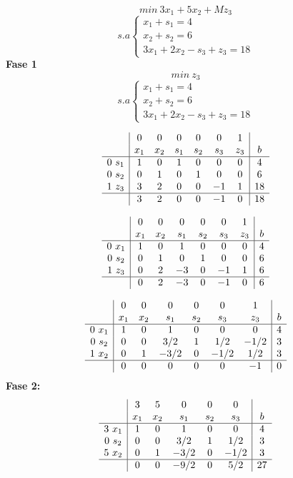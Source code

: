 \begin{ejemplo}
  
  $$ min ~ 3x_1+5x_2+M z_3 $$
  $$ s.a
  \left\{
    \begin{array}{c}
      x_1+s_1=4 \\
      x_2 + s_2 = 6 \\
      3x_1+2x_2-s_3+z_3=18
    \end{array}
  \right.
  $$
  \textbf{Fase 1}
  $$ min ~ z_3 $$
  $$ s.a \left\{
    \begin{array}{c}
      x_1+s_1=4 \\
      x_2 + s_2 = 6 \\
      3x_1+2x_2-s_3+z_3=18
    \end{array}
  \right.
  $$

  $$
  \begin{array}{c|cccccc|c}
    & 0 & 0 & 0 & 0 & 0 & 1 & \\
    & x_1 & x_2 & s_1 & s_2 & s_3 & z_3 & b \\ \hline
    0 ~ s_1 & 1 & 0 & 1 & 0 & 0 & 0 & 4 \\
    0 ~ s_2 & 0 & 1 & 0 & 1 & 0 & 0 & 6 \\
    1 ~ z_3 & 3 & 2 & 0 & 0 & -1 & 1 & 18 \\ \hline
    & 3 & 2 & 0 & 0 & -1 & 0 & 18
  \end{array}
  $$

  $$
  \begin{array}{c|cccccc|c}
    & 0 & 0 & 0 & 0 & 0 & 1 & \\
    & x_1 & x_2 & s_1 & s_2 & s_3 & z_3 & b \\ \hline
    0 ~ x_1 & 1 & 0 & 1 & 0 & 0 & 0 & 4 \\
    0 ~ s_2 & 0 & 1 & 0 & 1 & 0 & 0 & 6 \\
    1 ~ z_3 & 0 & 2 & -3 & 0 & -1 & 1 & 6 \\ \hline
    & 0 & 2 & -3 & 0 & -1 & 0 & 6
  \end{array}
  $$

  $$
  \begin{array}{c|cccccc|c}
    & 0 & 0 & 0 & 0 & 0 & 1 & \\
    & x_1 & x_2 & s_1 & s_2 & s_3 & z_3 & b \\ \hline
    0 ~ x_1 & 1 & 0 & 1 & 0 & 0 & 0 & 4 \\
    0 ~ s_2 & 0 & 0 & 3/2 & 1 & 1/2 & -1/2 & 3 \\
    1 ~ x_2 & 0 & 1 & -3/2 & 0 & -1/2 & 1/2 & 3 \\ \hline
    & 0 & 0 & 0 & 0 & 0 & -1 & 0 
  \end{array}
  $$
  \textbf{Fase 2: }
  $$
  \begin{array}{c|ccccc|c}
    & 3 & 5 & 0 & 0 & 0 & \\
    & x_1 & x_2 & s_1 & s_2 & s_3 & b \\ \hline
    3 ~ x_1 & 1 & 0 & 1 & 0 & 0 & 4 \\
    0 ~ s_2 & 0 & 0 & 3/2 & 1 & 1/2 & 3 \\
    5 ~ x_2 & 0 & 1 & -3/2 & 0 & -1/2 & 3 \\ \hline
    & 0 & 0 & -9/2 & 0  & 5/2 & 27 
  \end{array}
  $$
\end{ejemplo}

